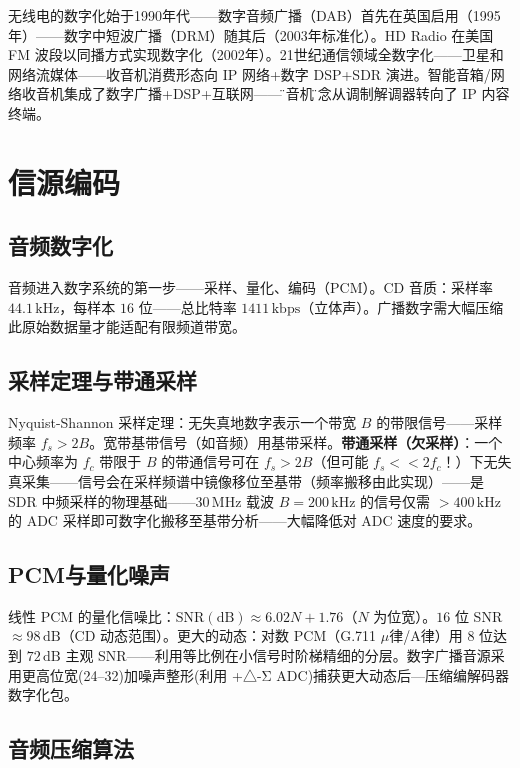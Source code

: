 \documentclass[12pt,UTF8]{ctexbook}
\begin{document}
无线电的数字化始于1990年代——数字音频广播（DAB）首先在英国启用（1995年）——数字中短波广播（DRM）随其后（2003年标准化）。HD Radio 在美国 FM 波段以同播方式实现数字化（2002年）。21世纪通信领域全数字化——卫星和网络流媒体——收音机消费形态向 IP 网络+数字 DSP+SDR 演进。智能音箱/网络收音机集成了数字广播+DSP+互联网——\"收音机\"概念从调制解调器转向了 IP 内容终端。

\section{信源编码}
\label{sec:source_coding}

\subsection{音频数字化}

音频进入数字系统的第一步——采样、量化、编码（PCM）。CD 音质：采样率 $44.1\,\mathrm{kHz}$，每样本 $16$ 位——总比特率 $1411\,\mathrm{kbps}$（立体声）。广播数字需大幅压缩此原始数据量才能适配有限频道带宽。

\subsection{采样定理与带通采样}

Nyquist-Shannon 采样定理：无失真地数字表示一个带宽 $B$ 的带限信号——采样频率 $f_s > 2B$。宽带基带信号（如音频）用基带采样。\textbf{带通采样（欠采样）}：一个中心频率为 $f_c$ 带限于 $B$ 的带通信号可在 $f_s > 2B$（但可能 $f_s << 2f_c$！）下无失真采集——信号会在采样频谱中镜像移位至基带（频率搬移由此实现）——是 SDR 中频采样的物理基础——$30\,\mathrm{MHz}$ 载波 $B=200\,\mathrm{kHz}$ 的信号仅需 $>400\,\mathrm{kHz}$ 的 ADC 采样即可数字化搬移至基带分析——大幅降低对 ADC 速度的要求。

\subsection{PCM与量化噪声}

线性 PCM 的量化信噪比：$\mathrm{SNR(dB)} \approx 6.02N + 1.76$（$N$ 为位宽）。$16$ 位 SNR $\approx 98\,\mathrm{dB}$（CD 动态范围）。更大的动态：对数 PCM（G.711 $\mu$律/A律）用 8 位达到 $72\,\mathrm{dB}$ 主观 SNR——利用等比例在小信号时阶梯精细的分层。数字广播音源采用更高位宽(24–32)加噪声整形(利用 +△-Σ ADC)捕获更大动态后—压缩编解码器数字化包。

\subsection{音频压缩算法}
\end{document}
